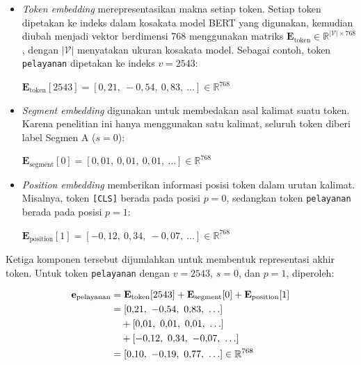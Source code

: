 \begin{enumerate}
    \begin{itemize}
        \item \textit{Token embedding} merepresentasikan makna setiap token. Setiap token dipetakan ke indeks dalam kosakata model BERT yang digunakan, kemudian diubah menjadi vektor berdimensi 768 menggunakan matriks $\mathbf{E}_{\text{token}} \in \mathbb{R}^{|\mathcal{V}| \times 768}$, dengan $|\mathcal{V}|$ menyatakan ukuran kosakata model. Sebagai contoh, token \texttt{pelayanan} dipetakan ke indeks $v = 2543$:
        
        \begin{center}
            $\mathbf{E}_{\text{token}}[2543] = [0{,}21,\ {-}0{,}54,\ 0{,}83,\ \ldots] \in \mathbb{R}^{768}$
        \end{center}

        \item \textit{Segment embedding} digunakan untuk membedakan asal kalimat suatu token. Karena penelitian ini hanya menggunakan satu kalimat, seluruh token diberi label Segmen A ($s = 0$):
        
        \begin{center}
            $\mathbf{E}_{\text{segment}}[0] = [0{,}01,\ 0{,}01,\ 0{,}01,\ \ldots] \in \mathbb{R}^{768}$
        \end{center}

        \item \textit{Position embedding} memberikan informasi posisi token dalam urutan kalimat. Misalnya, token \texttt{[CLS]} berada pada posisi $p = 0$, sedangkan token \texttt{pelayanan} berada pada posisi $p = 1$:
        
        \begin{center}
            $\mathbf{E}_{\text{position}}[1] = [{-}0{,}12,\ 0{,}34,\ {-}0{,}07,\ \ldots] \in \mathbb{R}^{768}$
        \end{center}
    \end{itemize}

    Ketiga komponen tersebut dijumlahkan untuk membentuk representasi akhir token. Untuk token \texttt{pelayanan} dengan $v = 2543$, $s = 0$, dan $p = 1$, diperoleh:

    \begin{align}
        \mathbf{e}_{\text{pelayanan}}
        &= \mathbf{E}_{\text{token}}[2543]
        + \mathbf{E}_{\text{segment}}[0]
        + \mathbf{E}_{\text{position}}[1] \notag \\
        &= [0{,}21,\ {-}0{,}54,\ 0{,}83,\ \ldots] \notag \\
        &\quad + [0{,}01,\ 0{,}01,\ 0{,}01,\ \ldots] \notag \\
        &\quad + [{-}0{,}12,\ 0{,}34,\ {-}0{,}07,\ \ldots] \notag \\
        &= [0{,}10,\ {-}0{,}19,\ 0{,}77,\ \ldots] \in \mathbb{R}^{768}
        \label{eq:embedding_pelayanan}
    \end{align}


\end{enumerate}
